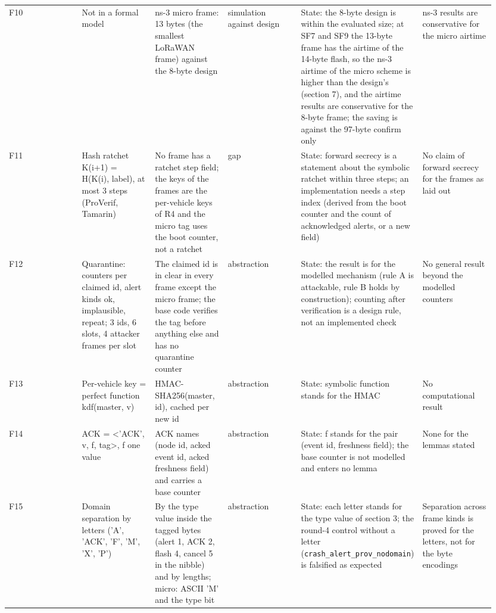 {\begin{longtable}{p{0.158\linewidth}p{0.158\linewidth}p{0.158\linewidth}p{0.158\linewidth}p{0.158\linewidth}p{0.158\linewidth}}
F10 & Not in a formal model & ns-3 micro frame: 13 bytes (the smallest LoRaWAN frame) against the 8-byte design & simulation against design & State: the 8-byte design is within the evaluated size; at SF7 and SF9 the 13-byte frame has the airtime of the 14-byte flash, so the ns-3 airtime of the micro scheme is higher than the design's (section 7), and the airtime results are conservative for the 8-byte frame; the saving is against the 97-byte confirm only & ns-3 results are conservative for the micro airtime \\
F11 & Hash ratchet K(i+1) = H(K(i), label), at most 3 steps (ProVerif, Tamarin) & No frame has a ratchet step field; the keys of the frames are the per-vehicle keys of R4 and the micro tag uses the boot counter, not a ratchet & gap & State: forward secrecy is a statement about the symbolic ratchet within three steps; an implementation needs a step index (derived from the boot counter and the count of acknowledged alerts, or a new field) & No claim of forward secrecy for the frames as laid out \\
F12 & Quarantine: counters per claimed id, alert kinds ok, implausible, repeat; 3 ids, 6 slots, 4 attacker frames per slot & The claimed id is in clear in every frame except the micro frame; the base code verifies the tag before anything else and has no quarantine counter & abstraction & State: the result is for the modelled mechanism (rule A is attackable, rule B holds by construction); counting after verification is a design rule, not an implemented check & No general result beyond the modelled counters \\
F13 & Per-vehicle key = perfect function kdf(master, v) & HMAC-SHA256(master, id), cached per new id & abstraction & State: symbolic function stands for the HMAC & No computational result \\
F14 & ACK = <'ACK', v, f, tag>, f one value & ACK names (node id, acked event id, acked freshness field) and carries a base counter & abstraction & State: f stands for the pair (event id, freshness field); the base counter is not modelled and enters no lemma & None for the lemmas stated \\
F15 & Domain separation by letters ('A', 'ACK', 'F', 'M', 'X', 'P') & By the type value inside the tagged bytes (alert 1, ACK 2, flash 4, cancel 5 in the nibble) and by lengths; micro: ASCII 'M' and the type bit & abstraction & State: each letter stands for the type value of section 3; the round-4 control without a letter (\texttt{crash\_alert\_prov\_nodomain}) is falsified as expected & Separation across frame kinds is proved for the letters, not for the byte encodings \\

\end{longtable}}
